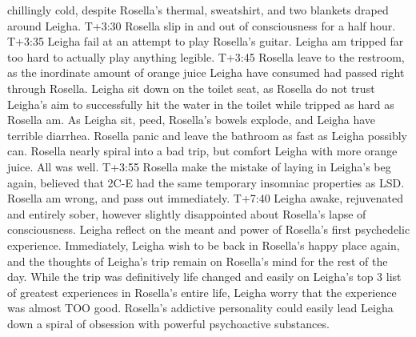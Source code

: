 \documentclass[12pt]{book}
\begin{document}
chillingly cold, despite Rosella's thermal, sweatshirt, and two blankets draped around Leigha. T+3:30 Rosella slip in and out of consciousness for a half hour. T+3:35 Leigha fail at an attempt to play Rosella's guitar. Leigha am tripped far too hard to actually play anything legible. T+3:45 Rosella leave to the restroom, as the inordinate amount of orange juice Leigha have consumed had passed right through Rosella. Leigha sit down on the toilet seat, as Rosella do not trust Leigha's aim to successfully hit the water in the toilet while tripped as hard as Rosella am. As Leigha sit, peed, Rosella's bowels explode, and Leigha have terrible diarrhea. Rosella panic and leave the bathroom as fast as Leigha possibly can. Rosella nearly spiral into a bad trip, but comfort Leigha with more orange juice. All was well. T+3:55 Rosella make the mistake of laying in Leigha's beg again, believed that 2C-E had the same temporary insomniac properties as LSD. Rosella am wrong, and pass out immediately. T+7:40 Leigha awake, rejuvenated and entirely sober, however slightly disappointed about Rosella's lapse of consciousness. Leigha reflect on the meant and power of Rosella's first psychedelic experience. Immediately, Leigha wish to be back in Rosella's happy place again, and the thoughts of Leigha's trip remain on Rosella's mind for the rest of the day. While the trip was definitively life changed and easily on Leigha's top 3 list of greatest experiences in Rosella's entire life, Leigha worry that the experience was almost TOO good. Rosella's addictive personality could easily lead Leigha down a spiral of obsession with powerful psychoactive substances.
\end{document}
